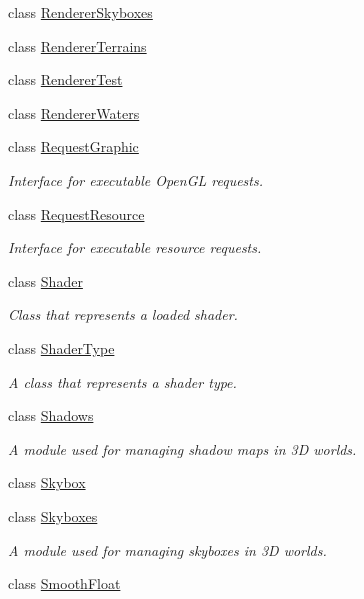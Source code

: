\begin{DoxyCompactItemize}
class \hyperlink{class_flounder_1_1_renderer_skyboxes}{Renderer\+Skyboxes}
\item 
class \hyperlink{class_flounder_1_1_renderer_terrains}{Renderer\+Terrains}
\item 
class \hyperlink{class_flounder_1_1_renderer_test}{Renderer\+Test}
\item 
class \hyperlink{class_flounder_1_1_renderer_waters}{Renderer\+Waters}
\item 
class \hyperlink{class_flounder_1_1_request_graphic}{Request\+Graphic}
\begin{DoxyCompactList}\small\item\em Interface for executable Open\+GL requests. \end{DoxyCompactList}\item 
class \hyperlink{class_flounder_1_1_request_resource}{Request\+Resource}
\begin{DoxyCompactList}\small\item\em Interface for executable resource requests. \end{DoxyCompactList}\item 
class \hyperlink{class_flounder_1_1_shader}{Shader}
\begin{DoxyCompactList}\small\item\em Class that represents a loaded shader. \end{DoxyCompactList}\item 
class \hyperlink{class_flounder_1_1_shader_type}{Shader\+Type}
\begin{DoxyCompactList}\small\item\em A class that represents a shader type. \end{DoxyCompactList}\item 
class \hyperlink{class_flounder_1_1_shadows}{Shadows}
\begin{DoxyCompactList}\small\item\em A module used for managing shadow maps in 3D worlds. \end{DoxyCompactList}\item 
class \hyperlink{class_flounder_1_1_skybox}{Skybox}
\item 
class \hyperlink{class_flounder_1_1_skyboxes}{Skyboxes}
\begin{DoxyCompactList}\small\item\em A module used for managing skyboxes in 3D worlds. \end{DoxyCompactList}\item 
class \hyperlink{class_flounder_1_1_smooth_float}{Smooth\+Float}

\end{DoxyCompactItemize}
